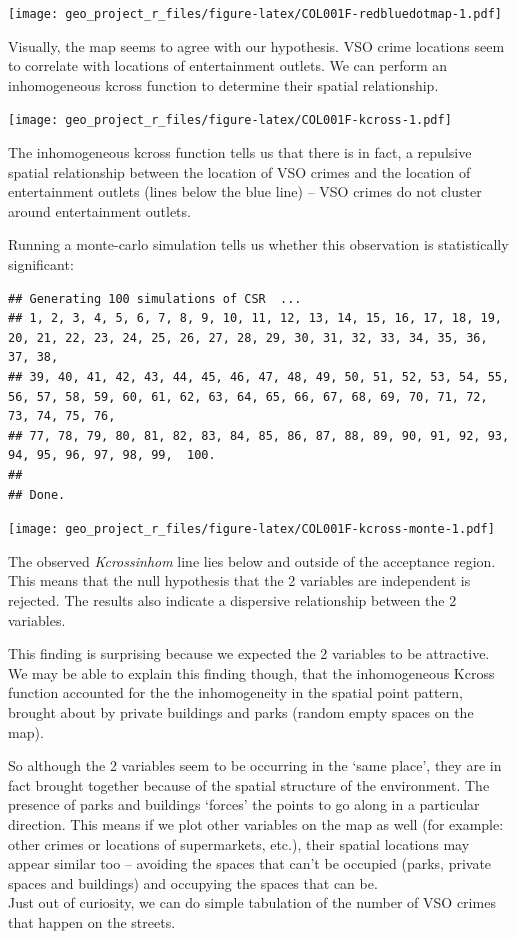 \documentclass[]{article}
\begin{document}
\texttt{[image: geo\_project\_r\_files/figure-latex/COL001F-redbluedotmap-1.pdf]}

Visually, the map seems to agree with our hypothesis. VSO crime
locations seem to correlate with locations of entertainment outlets. We
can perform an inhomogeneous kcross function to determine their spatial
relationship.

\texttt{[image: geo\_project\_r\_files/figure-latex/COL001F-kcross-1.pdf]}

The inhomogeneous kcross function tells us that there is in fact, a
repulsive spatial relationship between the location of VSO crimes and
the location of entertainment outlets (lines below the blue line) -- VSO
crimes do not cluster around entertainment outlets.

Running a monte-carlo simulation tells us whether this observation is
statistically significant:

\begin{verbatim}
## Generating 100 simulations of CSR  ...
## 1, 2, 3, 4, 5, 6, 7, 8, 9, 10, 11, 12, 13, 14, 15, 16, 17, 18, 19, 20, 21, 22, 23, 24, 25, 26, 27, 28, 29, 30, 31, 32, 33, 34, 35, 36, 37, 38,
## 39, 40, 41, 42, 43, 44, 45, 46, 47, 48, 49, 50, 51, 52, 53, 54, 55, 56, 57, 58, 59, 60, 61, 62, 63, 64, 65, 66, 67, 68, 69, 70, 71, 72, 73, 74, 75, 76,
## 77, 78, 79, 80, 81, 82, 83, 84, 85, 86, 87, 88, 89, 90, 91, 92, 93, 94, 95, 96, 97, 98, 99,  100.
## 
## Done.
\end{verbatim}

\texttt{[image: geo\_project\_r\_files/figure-latex/COL001F-kcross-monte-1.pdf]}

The observed \emph{Kcrossinhom} line lies below and outside of the
acceptance region. This means that the null hypothesis that the 2
variables are independent is rejected. The results also indicate a
dispersive relationship between the 2 variables.

This finding is surprising because we expected the 2 variables to be
attractive. We may be able to explain this finding though, that the
inhomogeneous Kcross function accounted for the the inhomogeneity in the
spatial point pattern, brought about by private buildings and parks
(random empty spaces on the map).

So although the 2 variables seem to be occurring in the `same place',
they are in fact brought together because of the spatial structure of
the environment. The presence of parks and buildings `forces' the points
to go along in a particular direction. This means if we plot other
variables on the map as well (for example: other crimes or locations of
supermarkets, etc.), their spatial locations may appear similar too --
avoiding the spaces that can't be occupied (parks, private spaces and
buildings) and occupying the spaces that can be.\\
Just out of curiosity, we can do simple tabulation of the number of VSO
crimes that happen on the streets.
\end{document}
